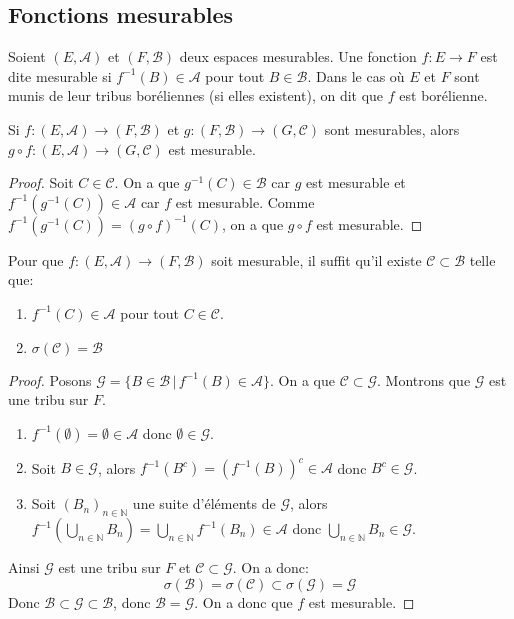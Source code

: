 \subsection{Fonctions mesurables}

\begin{definition}
	Soient $(E, \mathscr{A})$ et $(F, \mathscr{B})$ deux espaces mesurables. Une fonction $f: E \to F$ est dite mesurable si
	$f^{-1}(B) \in \mathscr{A}$ pour tout $B \in \mathscr{B}$.
	Dans le cas où $E$ et $F$ sont munis de leur tribus boréliennes (si elles existent), on dit que $f$ est borélienne.
\end{definition}


\begin{prop}
	Si $f: (E, \mathscr{A}) \to (F, \mathscr{B})$ et $g: (F, \mathscr{B}) \to (G, \mathscr{C})$
	sont mesurables, alors $g \circ f : (E, \mathscr{A}) \to (G, \mathscr{C})$ est mesurable.
\end{prop}

\begin{proof}
	Soit $C \in \mathscr{C}$. On a que $g^{-1}(C) \in \mathscr{B}$ car $g$ est mesurable et
	$f^{-1}(g^{-1}(C)) \in \mathscr{A}$ car $f$ est mesurable.
	Comme $f^{-1}(g^{-1}(C)) = (g \circ f)^{-1}(C)$, on a que $g \circ f$ est mesurable.
\end{proof}


\begin{prop}
	Pour que $f : (E, \mathscr{A}) \to (F, \mathscr{B})$ soit mesurable, il suffit qu'il existe $\mathscr{C} \subset \mathscr{B}$ telle que:
	\begin{enumerate}
		\item $f^{-1}(C) \in \mathscr{A}$ pour tout $C \in \mathscr{C}$.
		\item $\sigma(\mathscr{C}) = \mathscr{B}$
	\end{enumerate}
\end{prop}

\begin{proof}
	Posons $\mathscr{G} = \{ B \in \mathscr{B} \, | \, f^{-1}(B) \in \mathscr{A} \}$. On a que $\mathscr{C} \subset \mathscr{G}$.
	Montrons que $\mathscr{G}$ est une tribu sur $F$.
	\begin{enumerate}
		\item $f^{-1}(\emptyset) = \emptyset \in \mathscr{A}$ donc $\emptyset \in \mathscr{G}$.
		\item Soit $B \in \mathscr{G}$, alors $f^{-1}(B^c) = (f^{-1}(B))^c \in \mathscr{A}$ donc $B^c \in \mathscr{G}$.
		\item Soit $(B_n)_{n \in \mathbb{N}}$ une suite d'éléments de $\mathscr{G}$, alors
		      $f^{-1}(\bigcup\limits_{n \in \mathbb{N}} B_n) = \bigcup\limits_{n \in \mathbb{N}} f^{-1}(B_n) \in \mathscr{A}$ donc
		      $\bigcup\limits_{n \in \mathbb{N}} B_n \in \mathscr{G}$.
	\end{enumerate}
	Ainsi $\mathscr{G}$ est une tribu sur $F$ et $\mathscr{C} \subset \mathscr{G}$.
	On a donc:
	\[ \sigma(\mathscr{B}) = \sigma(\mathscr{C}) \subset \sigma(\mathscr{G}) = \mathscr{G} \]
	Donc $\mathscr{B} \subset \mathscr{G} \subset \mathscr{B}$, donc $\mathscr{B} = \mathscr{G}$.
	On a donc que $f$ est mesurable.
\end{proof}


